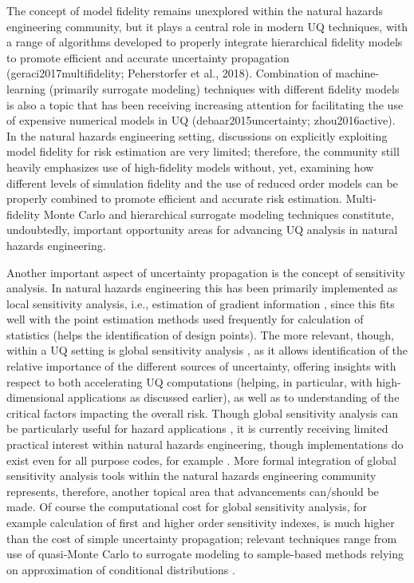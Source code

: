 The concept of model fidelity remains unexplored within the natural hazards engineering community, but it plays a central role in modern UQ techniques, with a range of algorithms developed to properly integrate hierarchical fidelity models to promote efficient and accurate uncertainty propagation (geraci2017multifidelity; Peherstorfer et al., 2018). Combination of machine-learning (primarily surrogate modeling) techniques with different fidelity models is also a topic that has been receiving increasing attention for facilitating the use of expensive numerical models in UQ (debaar2015uncertainty; zhou2016active). In the natural hazards engineering setting, discussions on explicitly exploiting model fidelity for risk estimation are very limited; therefore, the community still heavily emphasizes use of high-fidelity models without, yet, examining how different levels of simulation fidelity and the use of reduced order models can be properly combined to promote efficient and accurate risk estimation. Multi-fidelity Monte Carlo and hierarchical surrogate modeling techniques constitute, undoubtedly, important opportunity areas for advancing UQ analysis in natural hazards engineering.

Another important aspect of uncertainty propagation is the concept of sensitivity analysis. In natural hazards engineering this has been primarily implemented as local sensitivity analysis, i.e., estimation of gradient information \citep{haukaas2007methods,gu2009finite},  since this fits well with the point estimation methods used frequently for calculation of statistics (helps the identification of design points). The more relevant, though, within a UQ setting is global sensitivity analysis \citep{sobol1990sensitivity,saltelli2002making,rahman2016fsensitivity}, as it allows identification of the relative importance of the different sources of uncertainty, offering insights with respect to both accelerating UQ computations (helping, in particular, with high-dimensional applications as discussed earlier), as well as to understanding of the critical factors impacting the overall risk. Though global sensitivity analysis can be particularly useful for hazard applications \citep{vetter2012global}, it is currently receiving limited practical interest within natural hazards engineering, though implementations do exist even for all purpose codes, for example \citep{bourinet2009review}. More formal integration of global sensitivity analysis tools within the natural hazards engineering community represents, therefore, another topical area that advancements can/should be made. Of course the computational cost for global sensitivity analysis, for example calculation of first and higher order sensitivity indexes, is much higher than the cost of simple uncertainty propagation; relevant techniques range from use of quasi-Monte Carlo \citep{saltelli2002making} to surrogate modeling \citep{sudret2008global} to sample-based methods relying on approximation of conditional distributions \citep{li2016efficient,hu2019probability}.  


